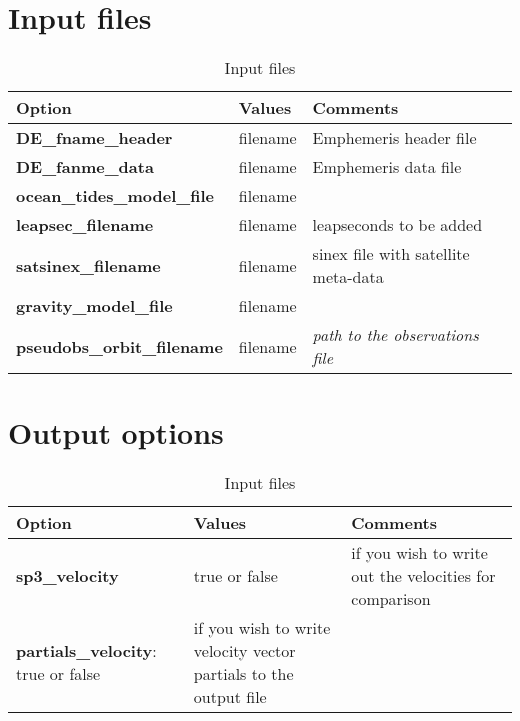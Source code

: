\section{Input files}
\begin{table}[h!]
	\begin{tabular}{|p{2.5cm}|p{2.5cm}|p{5cm}|}
		\hline
		Option & Values & Comments \\
		\hline
        \textbf{DE\_fname\_header} & filename &  Emphemeris header file \\
        \textbf{DE\_fanme\_data} & filename & Emphemeris data file \\
        \textbf{ocean\_tides\_model\_file} & filename & \\
        \textbf{leapsec\_filename} & filename & leapseconds to be added\\
        \textbf{satsinex\_filename} & filename & sinex file with satellite meta-data\\
        \textbf{gravity\_model\_file} & filename & \\
        \textbf{pseudobs\_orbit\_filename} & filename & \emph{path to the observations file}\\
		\hline
	\end{tabular}
	\caption{Input files}
	\label{table:label_name}
\end{table}

\section{Output options}
\begin{table}[h!]
	\begin{tabular}{|p{2.5cm}|p{2.5cm}|p{5cm}|}
		\hline
		Option & Values & Comments \\
		\hline
        \textbf{sp3\_velocity} & true or false & if you wish to write out the velocities for comparison \\
        \textbf{partials\_velocity}: true or false & if you wish to write velocity vector partials to the output file\\
		\hline
	\end{tabular}
	\caption{Input files}
	\label{table:label_name}
\end{table}

